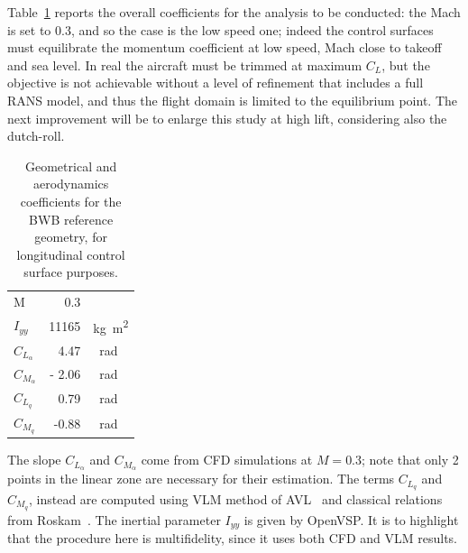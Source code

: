 Table~\ref{tab:overall_param_bwb_flight_dyn} reports the overall coefficients for the analysis to be conducted: the Mach is set to 0.3, and so the case is the low speed one; indeed the control surfaces must equilibrate the momentum coefficient at low speed, Mach close to takeoff and sea level.
In real the aircraft must be trimmed at maximum $C_L$, but the objective is not achievable without a level of refinement that includes a full RANS model, and thus the flight domain is limited to the equilibrium point. 
The next improvement will be to enlarge this study at high lift, considering also the dutch-roll. 
\begin{table}[!h]
	\centering
	\begin{tabular}{l r l}
		\hline
		M & 0.3 & \\
		$I_{yy}$ & 11165 & \si{\kilogram\square\meter} \\
		$C_{L_{\alpha}}$ & 4.47 & \si{\per\radian} \\
		$C_{M_{\alpha}}$ & - 2.06 & \si{\per\radian} \\
		$C_{L_{q}}$ & 0.79 & \si{\per\radian} \\
		$C_{M_{q}}$ & -0.88 & \si{\per\radian} \\
		\hline
	\end{tabular}
	\caption{Geometrical and aerodynamics coefficients for the BWB reference geometry, for longitudinal control surface purposes.}
	\label{tab:overall_param_bwb_flight_dyn}
\end{table}

The slope $C_{L_{\alpha}}$ and $C_{M_{\alpha}}$ come from CFD simulations at $M=0.3$; note that only 2 points in the linear zone are necessary for their estimation.
The terms $C_{L_{q}}$ and $C_{M_{q}}$, instead are computed using VLM method of AVL~\cite{bib:avl} and classical relations from Roskam~\cite{bib:roskam_flight_dynamics}. 
The inertial parameter $I_{yy}$ is given by OpenVSP.
It is to highlight that the procedure here is multifidelity, since it uses both CFD and VLM results.

